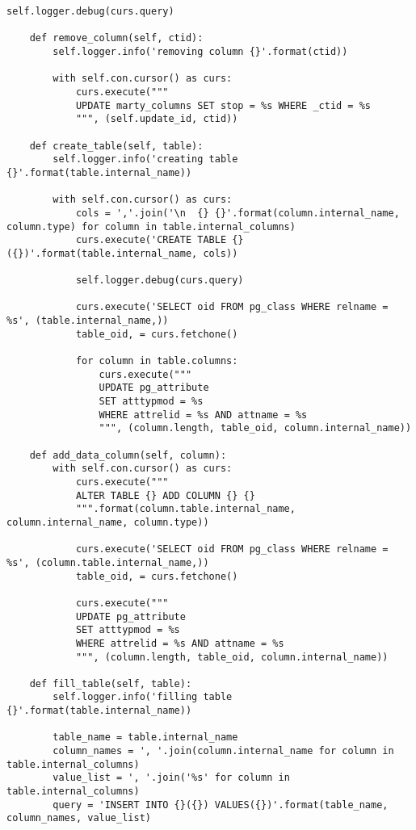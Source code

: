 \begin{lstlisting}[caption={populator.py}]
            self.logger.debug(curs.query)

    def remove_column(self, ctid):
        self.logger.info('removing column {}'.format(ctid))

        with self.con.cursor() as curs:
            curs.execute("""
            UPDATE marty_columns SET stop = %s WHERE _ctid = %s
            """, (self.update_id, ctid))

    def create_table(self, table):
        self.logger.info('creating table {}'.format(table.internal_name))

        with self.con.cursor() as curs:
            cols = ','.join('\n  {} {}'.format(column.internal_name, column.type) for column in table.internal_columns)
            curs.execute('CREATE TABLE {}({})'.format(table.internal_name, cols))

            self.logger.debug(curs.query)

            curs.execute('SELECT oid FROM pg_class WHERE relname = %s', (table.internal_name,))
            table_oid, = curs.fetchone()

            for column in table.columns:
                curs.execute("""
                UPDATE pg_attribute
                SET atttypmod = %s
                WHERE attrelid = %s AND attname = %s
                """, (column.length, table_oid, column.internal_name))

    def add_data_column(self, column):
        with self.con.cursor() as curs:
            curs.execute("""
            ALTER TABLE {} ADD COLUMN {} {}
            """.format(column.table.internal_name, column.internal_name, column.type))

            curs.execute('SELECT oid FROM pg_class WHERE relname = %s', (column.table.internal_name,))
            table_oid, = curs.fetchone()

            curs.execute("""
            UPDATE pg_attribute
            SET atttypmod = %s
            WHERE attrelid = %s AND attname = %s
            """, (column.length, table_oid, column.internal_name))

    def fill_table(self, table):
        self.logger.info('filling table {}'.format(table.internal_name))

        table_name = table.internal_name
        column_names = ', '.join(column.internal_name for column in table.internal_columns)
        value_list = ', '.join('%s' for column in table.internal_columns)
        query = 'INSERT INTO {}({}) VALUES({})'.format(table_name, column_names, value_list)


\end{lstlisting}
